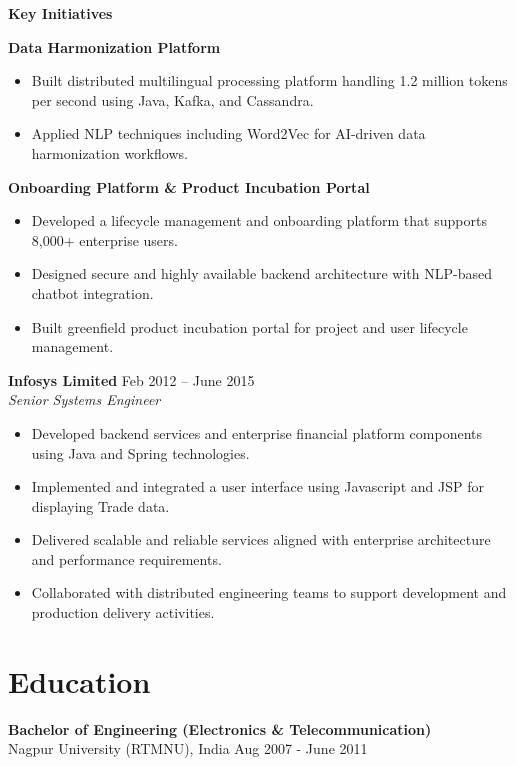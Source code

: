 \documentclass[11pt,a4paper]{article}
\begin{document}
\textbf{Key Initiatives}

\textbf{Data Harmonization Platform}
\begin{itemize}
    \item Built distributed multilingual processing platform handling 1.2 million tokens per second using Java, Kafka, and Cassandra.
    
    \item Applied NLP techniques including Word2Vec for AI-driven data harmonization workflows.
\end{itemize}

\textbf{Onboarding Platform \& Product Incubation Portal}
\begin{itemize}
    \item Developed a lifecycle management and onboarding platform that supports 8,000+ enterprise users.
    
    \item Designed secure and highly available backend architecture with NLP-based chatbot integration.
    
    \item Built greenfield product incubation portal for project and user lifecycle management.
\end{itemize}

\vspace{4pt}

\textbf{Infosys Limited} \hfill Feb 2012 -- June 2015 \\
\textit{Senior Systems Engineer}

\begin{itemize}
    \item Developed backend services and enterprise financial platform components using Java and Spring technologies.
    \item Implemented and integrated a user interface using Javascript and JSP for displaying Trade data.
    \item Delivered scalable and reliable services aligned with enterprise architecture and performance requirements.
    
    \item Collaborated with distributed engineering teams to support development and production delivery activities.
\end{itemize}

\section*{Education}

\textbf{Bachelor of Engineering (Electronics \& Telecommunication)} \\
Nagpur University (RTMNU), India \hfill Aug 2007 - June 2011
\end{document}
